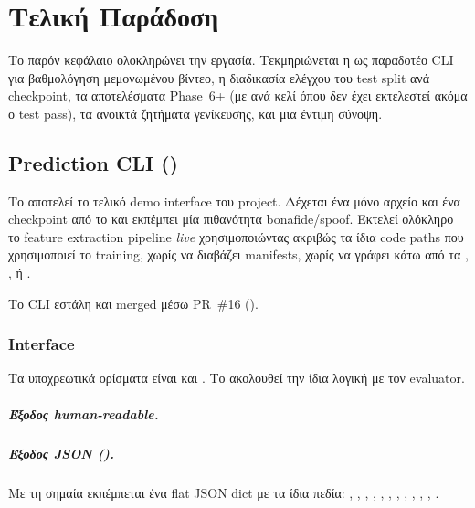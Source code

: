 \chapter{Τελική Παράδοση}
\label{chap:teliki-paradosi}

Το παρόν κεφάλαιο ολοκληρώνει την εργασία.
Τεκμηριώνεται η  ως παραδοτέο CLI
για βαθμολόγηση μεμονωμένου βίντεο,
η διαδικασία ελέγχου του test split ανά checkpoint,
τα αποτελέσματα Phase~6+ (με \todoMetric{} ανά κελί όπου δεν έχει εκτελεστεί ακόμα ο test pass),
τα ανοικτά ζητήματα γενίκευσης, και μια έντιμη σύνοψη.

\section{Prediction CLI ()}
\label{sec:predict-cli}

Το  αποτελεί το τελικό demo interface του project.
Δέχεται ένα μόνο αρχείο  και ένα checkpoint από το 
και εκπέμπει μία πιθανότητα bonafide/spoof.
Εκτελεί ολόκληρο το feature extraction pipeline \emph{live}
χρησιμοποιώντας ακριβώς τα ίδια code paths που χρησιμοποιεί το training,
χωρίς να διαβάζει manifests, χωρίς να γράφει κάτω από τα , , ή .

Το CLI εστάλη και merged μέσω PR~\#16 ().

\subsection{Interface}
\label{subsec:predict-interface}

Τα υποχρεωτικά ορίσματα είναι  και .
Το  ακολουθεί την ίδια λογική 
με τον evaluator.

\paragraph{Έξοδος human-readable.}
\paragraph{Έξοδος JSON ().}
Με τη σημαία  εκπέμπεται ένα flat JSON dict
με τα ίδια πεδία:
, , , ,
, ,
, , ,
, , .

